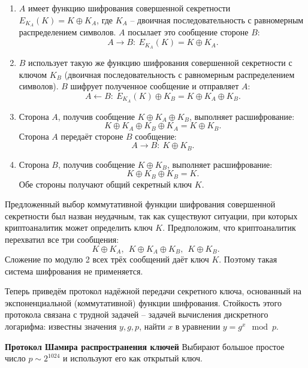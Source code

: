 \begin{enumerate}
    \item $A$ имеет функцию шифрования совершенной секретности $E_{K_A}(K) = K \oplus K_A$, где $K_A$ -- двоичная последовательность с равномерным распределением символов. $A$ посылает это сообщение стороне $B$:
            \[ A \rightarrow B: ~ E_{K_A}(K) = K \oplus K_A. \]
    \item $B$ использует такую же функцию шифрования совершенной секретности с ключом $K_B$ (двоичная последовательность с равномерным распределением символов). $B$ шифрует полученное сообщение и отправляет $A$:
            \[ A \leftarrow B: ~ E_{K_A}(K) \oplus K_B = K \oplus K_A \oplus K_B. \]
    \item Сторона $A$, получив сообщение $K \oplus K_A \oplus K_B$, выполняет расшифрование:
            \[ K \oplus K_A \oplus K_B \oplus K_A = K \oplus K_B. \]
        Сторона $A$ передаёт стороне $B$ сообщение:
            \[ A \rightarrow B: ~ K \oplus K_B. \]
    \item Сторона $B$, получив сообщение $K \oplus K_B$, выполняет расшифрование:
            \[ K \oplus K_B \oplus K_B = K. \]
        Обе стороны получают общий секретный ключ $K$.
\end{enumerate}

Предложенный выбор коммутативной функции шифрования совершенной секретности был назван неудачным, так как существуют ситуации, при которых криптоаналитик может определить ключ $K$. Предположим, что криптоаналитик перехватил все три сообщения:
    \[ K \oplus K_A, ~~ K \oplus K_A \oplus K_B, ~~ K \oplus K_B. \]
Сложение по модулю 2 всех трёх сообщений даёт ключ $K$. Поэтому такая система шифрования не применяется.

Теперь приведём протокол надёжной передачи секретного ключа, основанный на экспоненциальной (коммутативной) функции шифрования. Стойкость этого протокола связана с трудной задачей -- задачей вычисления дискретного логарифма: известны значения $y, g, p$, найти $x$ в уравнении $y = g^x \mod p$.

\textbf{Протокол Шамира распространения ключей}
Выбирают большое простое число $p\sim 2^{1024}$ и используют его как открытый ключ.

